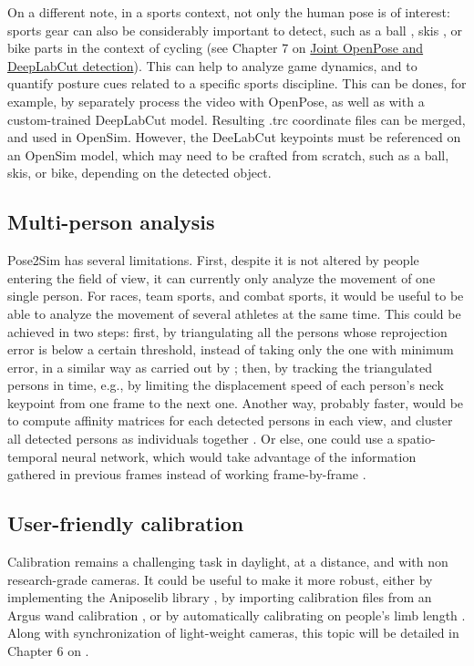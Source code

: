 On a different note, in a sports context, not only the human pose is of interest: sports gear can also be considerably important to detect, such as a ball \cite{Ghasemzadeh2021}, skis \cite{Ludwig2020}, or bike parts in the context of cycling (see Chapter 7 on \hyperref[ch:7]{Joint OpenPose and DeepLabCut detection}). This can help to analyze game dynamics, and to quantify posture cues related to a specific sports discipline. This can be dones, for example, by separately process the video with OpenPose, as well as with a custom-trained DeepLabCut model. Resulting .trc coordinate files can be merged, and used in OpenSim. However, the DeeLabCut keypoints must be referenced on an OpenSim model, which may need to be crafted from scratch, such as a ball, skis, or bike, depending on the detected object.


\subsection{Multi-person analysis}

Pose2Sim has several limitations. First, despite it is not altered by people entering the field of view, it can currently only analyze the movement of one single person. For races, team sports, and combat sports, it would be useful to be able to analyze the movement of several athletes at the same time. This could be achieved in two steps: first, by triangulating all the persons whose reprojection error is below a certain threshold, instead of taking only the one with minimum error, in a similar way as carried out by \cite{Slembrouck2020}; then, by tracking the triangulated persons in time, e.g., by limiting the displacement speed of each person’s neck keypoint from one frame to the next one. Another way, probably faster, would be to compute affinity matrices for each detected persons in each view, and cluster all detected persons as individuals together \cite{Dong2019}. Or else, one could use a spatio-temporal neural network, which would take advantage of the information gathered in previous frames instead of working frame-by-frame \cite{Raaj2019}.


\subsection{User-friendly calibration}

Calibration remains a challenging task in daylight, at a distance, and with non research-grade cameras. It could be useful to make it more robust, either by implementing the Aniposelib library \cite{Karashchuk2020}, by importing calibration files from an Argus wand calibration \cite{Argus2017}, or by automatically calibrating on people’s limb length \cite{Liu2022a}. Along with synchronization of light-weight cameras, this topic will be detailed in Chapter 6 on  \cite{Pagnon2022c}.


